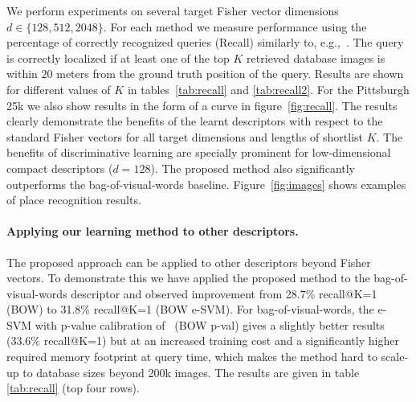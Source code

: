 \documentclass[10pt,twocolumn,letterpaper]{article}
\begin{document}
      We perform experiments on several target Fisher vector dimensions $d\in\{128,512,2048\}$. For each method we measure performance using the percentage of correctly recognized queries (Recall) similarly to, e.g.,~\cite{Chen11,Knopp2010,Sattler-BMVC12}. The query is correctly localized if at least one of the top $K$ retrieved database images is within $20$ meters from the ground truth position of the query. Results are shown for different values of $K$ in tables~\ref{tab:recall} and \ref{tab:recall2}. For the Pittsburgh 25k we also show results in the form of a curve in figure~\ref{fig:recall}. The results clearly demonstrate the benefits of the learnt descriptors with respect to the standard Fisher vectors for all target dimensions and lengths of shortlist $K$. The benefits of discriminative learning are specially prominent for low-dimensional compact descriptors ($d=128$). 
      The proposed method also significantly outperforms the bag-of-visual-words baseline. Figure~\ref{fig:images} shows examples of place recognition results. 

      \paragraph{Applying our learning method to other descriptors.}
        \textcolor{petr}{ 
         The proposed approach can be applied to other descriptors beyond Fisher vectors. To demonstrate this we have applied the proposed method to the bag-of-visual-words descriptor and observed improvement from 28.7\% recall@K=1 (BOW) to 31.8\% recall@K=1 (BOW e-SVM).  
For bag-of-visual-words,  the e-SVM with p-value calibration of~\cite{Gronat13} (BOW p-val) gives a slightly better results (33.6\% recall@K=1) but at an increased training cost and a significantly higher required memory footprint at query time, which makes the method hard to scale-up to database sizes beyond 200k images. The results are given in table \ref{tab:recall} (top four rows).
        }
\end{document}
